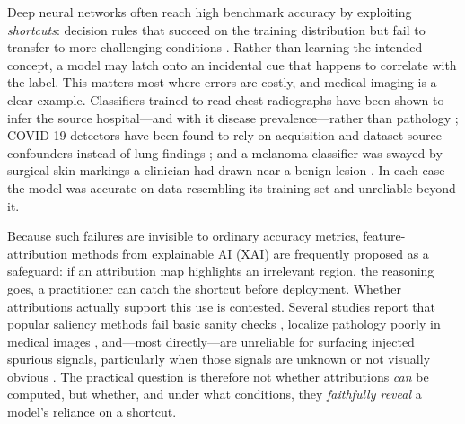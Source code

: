 \documentclass[11pt]{article}
\begin{document}
Deep neural networks often reach high benchmark accuracy by exploiting \emph{shortcuts}: decision
rules that succeed on the training distribution but fail to transfer to more challenging conditions
\citep{geirhos2020shortcut}. Rather than learning the intended concept, a model may latch onto an
incidental cue that happens to correlate with the label. This matters most where errors are costly,
and medical imaging is a clear example. Classifiers trained to read chest radiographs have been
shown to infer the source hospital---and with it disease prevalence---rather than pathology
\citep{zech2018variable}; COVID-19 detectors have been found to rely on acquisition and dataset-source
confounders instead of lung findings \citep{degrave2021ai}; and a melanoma classifier was swayed by
surgical skin markings a clinician had drawn near a benign lesion \citep{winkler2019association}.
In each case the model was accurate on data resembling its training set and unreliable beyond it.

Because such failures are invisible to ordinary accuracy metrics, feature-attribution methods from
explainable AI (XAI) are frequently proposed as a safeguard: if an attribution map highlights an
irrelevant region, the reasoning goes, a practitioner can catch the shortcut before deployment.
Whether attributions actually support this use is contested. Several studies report that popular
saliency methods fail basic sanity checks \citep{adebayo2018sanity}, localize pathology poorly in
medical images \citep{arun2021assessing,saporta2022benchmarking}, and---most directly---are
unreliable for surfacing injected spurious signals, particularly when those signals are unknown or
not visually obvious \citep{adebayo2020debugging,adebayo2022posthoc}. The practical question is
therefore not whether attributions \emph{can} be computed, but whether, and under what conditions,
they \emph{faithfully reveal} a model's reliance on a shortcut.
\end{document}
